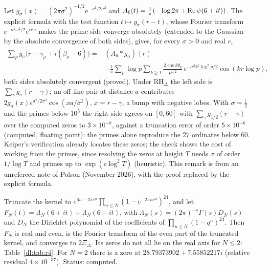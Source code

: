 \begin{remark}\label{dl:rem:gauss}
Let $g_\sigma(x)=(2\pi\sigma^2)^{-1/2}e^{-x^2/2\sigma^2}$ and $A_6(t)=\frac1\pi(-\log2\pi+\operatorname{Re}\psi(6+it))$. The explicit formula \cite[Theorem~5.12]{IwaniecKowalski04} with the test function $t\mapsto g_\sigma(r-t)$, whose Fourier transform $e^{-\sigma^2\omega^2/2}e^{ir\omega}$ makes the prime side converge absolutely (extended to the Gaussian by the absolute convergence of both sides), gives, for every $\sigma>0$ and real $r$,
\[\begin{split}\sum_\rho g_\sigma\bigl(r-\gamma_\rho+i(\beta_\rho-6)\bigr)={}&(A_6*g_\sigma)(r)\\&-\frac1\pi\sum_p\log p\sum_{k\ge1}\frac{2\cos k\theta_p}{p^{k/2}}\,e^{-\sigma^2k^2\log^2p/2}\cos(kr\log p),\end{split}\]
both sides absolutely convergent (proved). Under $\mathrm{RH}_\Delta$ the left side is $\sum_\gamma g_\sigma(r-\gamma)$; an off line pair at distance $a$ contributes $2g_\sigma(x)e^{a^2/2\sigma^2}\cos(xa/\sigma^2)$, $x=r-\gamma$, a bump with negative lobes. With $\sigma=\frac12$ and the primes below $10^5$ the right side agrees on $[0,60]$ with $\sum_\gamma g_{1/2}(r-\gamma)$ over the computed zeros to $3\times10^{-8}$, against a truncation error of order $5\times10^{-6}$ (computed, floating point): the primes alone reproduce the $27$ ordinates below $60$. Keiper's verification \cite{NCKeiper96} already locates these zeros; the check shows the cost of working from the primes, since resolving the zeros at height $T$ needs $\sigma$ of order $1/\log T$ and primes up to $\exp(c\log^2T)$ (heuristic). This remark is from an unrefereed note of Polson (November 2026), with the proof replaced by the explicit formula.
\end{remark}

\begin{proposition}\label{dl:prop:r4}
Truncate the kernel to $e^{6u-2\pi e^u}\prod_{n\le N}(1-e^{-2\pi ne^u})^{24}$, and let $F_N(t)=\Lambda_N(6+it)+\Lambda_N(6-it)$, with $\Lambda_N(s)=(2\pi)^{-s}\Gamma(s)D_N(s)$ and $D_N$ the Dirichlet polynomial of the coefficients of $\prod_{n\le N}(1-q^n)^{24}$. Then $F_N$ is real and even, is the Fourier transform of the even part of the truncated kernel, and converges to $2\Xi_\Delta$. Its zeros do not all lie on the real axis for $N\le2$: Table~\ref{dl:tab:r4}. For $N=2$ there is a zero at $28.79373902+7.55852217i$ (relative residual $4\times10^{-37}$). Status: computed.
\end{proposition}

